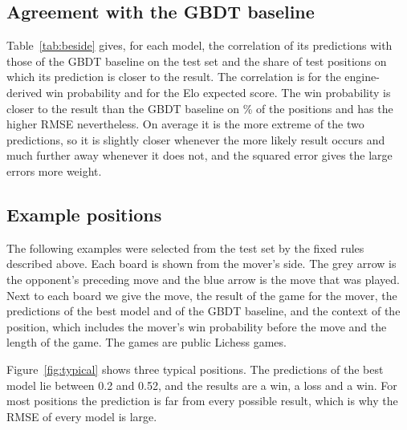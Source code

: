 \documentclass[11pt]{article}
\begin{document}
\subsection{Agreement with the GBDT baseline}

Table~\ref{tab:beside} gives, for each model, the correlation of its
predictions with those of the GBDT baseline on the test set and the share of
test positions on which its prediction is closer to the result. The
correlation is  for the engine-derived
win probability and  for the Elo expected
score. The win probability is closer to the result than the GBDT baseline on
\% of the positions and has the higher RMSE
nevertheless. On average it is the more extreme of the two predictions, so
it is slightly closer whenever the more likely result occurs and much further
away whenever it does not, and the squared error gives the large errors more
weight.

\begin{table}[htbp]\centering\small
{}
\caption{Agreement with the GBDT baseline on the test set: the correlation
between the two models' predictions, and the share of positions on which the
model's prediction is closer to the result than the baseline's.}
\label{tab:beside}
\end{table}

\subsection{Example positions}
\label{sec:positions}

The following examples were selected from the test set by the fixed rules
described above. Each board is shown from the mover's side. The grey arrow is
the opponent's preceding move and the blue arrow is the move that was played.
Next to each board we give the move, the result of the game for the mover,
the predictions of the best model and of the GBDT baseline, and the context
of the position, which includes the mover's win probability before the move
and the length of the game. The games are public Lichess games.

Figure~\ref{fig:typical} shows three typical positions. The predictions of
the best model lie between 0.2 and 0.52, and the results are a win, a loss
and a win. For most positions the prediction is far from every possible
result, which is why the RMSE of every model is large.
\end{document}
